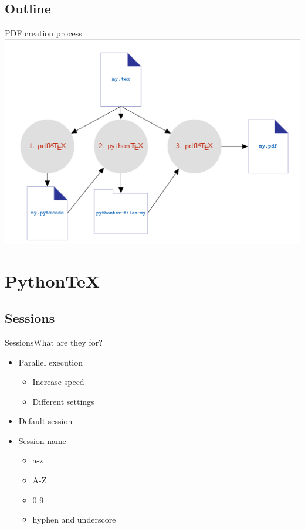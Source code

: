 \documentclass[
aspectratio=1610,
hyperref={pdfpagemode=FullScreen},
english,
usenames,
dvipsnames
]
{beamer} %
\begin{document}
\subsection{Outline}
\begin{frame}{PDF creation process}
	\includegraphics[scale=0.25]{img/compile.png}
\end{frame}
\section{Python\TeX}
\subsection{Sessions}
  \begin{frame}[fragile]{Sessions}{What are they for?}
  \begin{itemize}[<+->]
  \item Parallel execution
  	\begin{itemize}
  		\item Increase speed
  		\item Different settings
  	\end{itemize}
  \item Default session
  \item Session name
  	\begin{itemize}
  		\item a-z
  		\item A-Z
  		\item 0-9
  		\item hyphen and underscore
  		 \onslide
  	\end{itemize}
  \end{itemize}
\end{frame}
\end{document}
